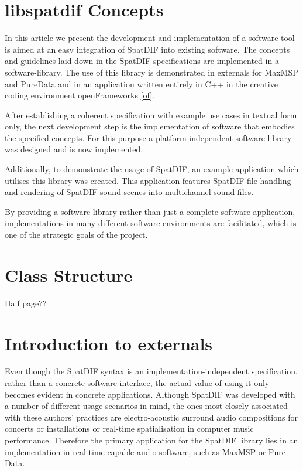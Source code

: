\documentclass{article}
\begin{document}
\section{libspatdif Concepts}


In this article we present the development and implementation of a software tool is aimed at an easy integration of SpatDIF into existing software.
The concepts and guidelines laid down in the SpatDIF specifications are implemented in a software-library.  
The use of this library is demonstrated in externals for MaxMSP and PureData and in an application written entirely in C++ in the creative coding environment openFrameworks \ref{of}.

After establishing a coherent specification with example use cases in textual form only, the next development step is the implementation of software that embodies the specified concepts.
For this purpose a platform-independent software library was designed and is now implemented. 


Additionally, to demonstrate the usage of SpatDIF, an example application which utilises this library was created. This application features SpatDIF file-handling and  rendering of SpatDIF sound scenes into multichannel sound files.

By providing a software library rather than just a complete software application, implementations in many different software environments are facilitated, which is one of the strategic goals of the project.


\section{Class Structure}\label{sec:class_structure}
Half page??

\section{Introduction to externals}
Even though the SpatDIF syntax is an implementation-independent specification, rather than a concrete software interface, the actual value of using it only becomes evident in concrete applications. Although SpatDIF was developed with a number of different usage scenarios in mind, the ones most closely associated with these authors' practices are electro-acoustic surround audio compositions for concerts or installations or real-time spatialisation in computer music performance.
Therefore the primary application for the SpatDIF library lies in an implementation in real-time capable audio software, such as MaxMSP or Pure Data.
\end{document}
